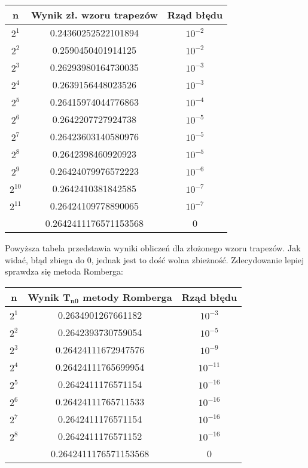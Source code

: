 \documentclass[a4paper,10pt]{article}
\begin{document}
    \begin{center}
    \begin{tabular}{ |c|c|c| }
     \hline
     \textbf{n} & \textbf{Wynik zł. wzoru trapezów} & \textbf{Rząd błędu} \\
     \hline
     $2^{1}$ & 0.24360252522101894 & $10^{-2}$\\
    \hline
    $2^{2}$ & 0.2590450401914125 & $10^{-2}$\\
    \hline
    $2^{3}$ & 0.26293980164730035 & $10^{-3}$\\
    \hline
    $2^{4}$ & 0.2639156448023526 & $10^{-3}$\\
    \hline
    $2^{5}$ & 0.26415974044776863 & $10^{-4}$\\
    \hline
    $2^{6}$ & 0.2642207727924738 & $10^{-5}$\\
    \hline
    $2^{7}$ & 0.26423603140580976 & $10^{-5}$\\
    \hline
    $2^{8}$ & 0.2642398460920923 & $10^{-5}$\\
    \hline
    $2^{9}$ & 0.26424079976572223 & $10^{-6}$\\
    \hline
    $2^{10}$ & 0.2642410381842585 & $10^{-7}$\\
    \hline
    $2^{11}$ & 0.26424109778890065 & $10^{-7}$\\
    \hline
    \hline
    & 0.2642411176571153568 & 0 \\
    \hline
    \end{tabular}
    \end{center}
    Powyższa tabela przedstawia wyniki obliczeń dla złożonego wzoru trapezów. Jak widać, błąd zbiega do 0, jednak jest to dość wolna zbieżność. Zdecydowanie lepiej sprawdza się metoda Romberga:
    \begin{center}
    \begin{tabular}{ |c|c|c| }
    \hline
     \textbf{n} & \textbf{Wynik $\bm{T_{n0}}$ metody Romberga} & \textbf{Rząd błędu} \\
     \hline
    $2^{1}$ & 0.2634901267661182 & $10^{-3}$\\
    \hline
    $2^{2}$ & 0.2642393730759054 & $10^{-5}$\\
    \hline
    $2^{3}$ & 0.26424111672947576 & $10^{-9}$\\
    \hline
    $2^{4}$ & 0.26424111765699954 & $10^{-11}$\\
    \hline
    $2^{5}$ & 0.2642411176571154 & $10^{-16}$\\
    \hline
    $2^{6}$ & 0.26424111765711533 & $10^{-16}$\\
    \hline
    $2^{7}$ & 0.2642411176571154 & $10^{-16}$\\
    \hline
    $2^{8}$ & 0.2642411176571152 & $10^{-16}$\\
    \hline
    \hline
    & 0.2642411176571153568 & 0 \\
    \hline
    \end{tabular}
    \end{center}
    
\end{document}
